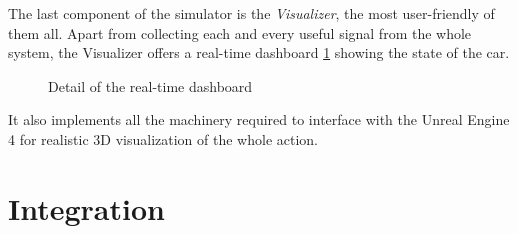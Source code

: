 		The last component of the simulator is the \emph{Visualizer}, the most user-friendly of them all. Apart from collecting each and every useful signal from the whole system,
		the Visualizer offers a real-time dashboard \ref{fig:vis-dash} showing the state of the car.
		\begin{figure}[htb]
			\centering
			\quad
			\caption{Detail of the real-time dashboard}
			\label{fig:vis-dash}
		\end{figure}

		It also implements all the machinery required to interface with the Unreal Engine 4 for realistic
		3D visualization of the whole action.


	\section{Integration}

